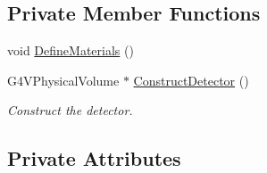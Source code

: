 \subsection*{Private Member Functions}
\begin{DoxyCompactItemize}
\item 
void \hyperlink{classUMDetectorConstruction_a06c0dcd8d247b0dc44b1081b36136da6}{Define\+Materials} ()
\item 
G4\+V\+Physical\+Volume $\ast$ \hyperlink{classUMDetectorConstruction_a5fd78be152534079d835da2c6a52c446}{Construct\+Detector} ()
\begin{DoxyCompactList}\small\item\em Construct the detector. \end{DoxyCompactList}\end{DoxyCompactItemize}
\subsection*{Private Attributes}
